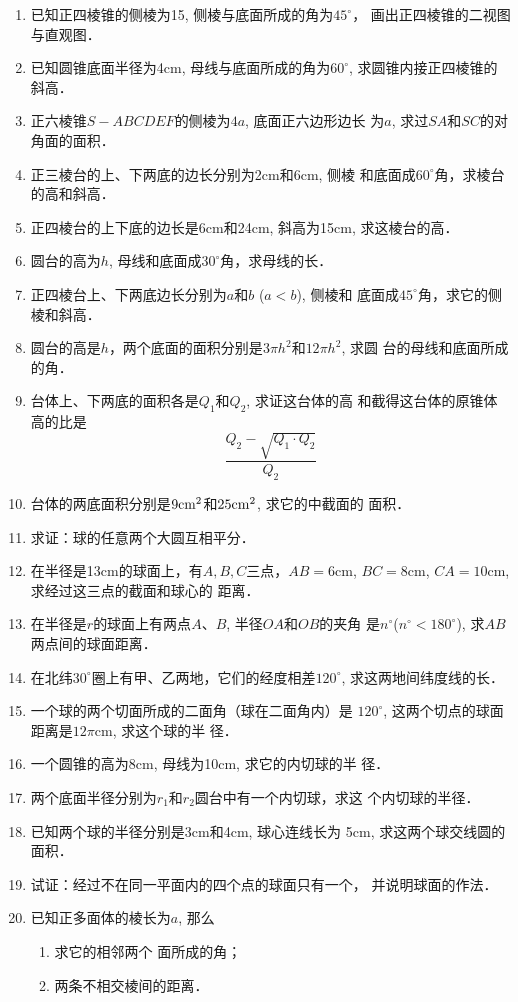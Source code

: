 \begin{enumerate}
\item 已知正四棱锥的侧棱为15, 侧棱与底面所成的角为$45^{\circ}$，
画出正四棱锥的二视图与直观图．
\item 已知圆锥底面半径为4cm, 母线与底面所成的角为$60^{\circ}$,
求圆锥内接正四棱锥的斜高．
\item 正六棱锥$S-ABCDEF$的侧棱为$4a$, 底面正六边形边长
为$a$, 求过$SA$和$SC$的对角面的面积．
\item 正三棱台的上、下两底的边长分别为2cm和6cm, 侧棱
和底面成$60^{\circ}$角，求棱台的高和斜高．
\item 正四棱台的上下底的边长是6cm和24cm, 斜高为15cm, 
求这棱台的高．
\item 圆台的高为$h$, 母线和底面成$30^{\circ}$角，求母线的长．
\item 正四棱台上、下两底边长分别为$a$和$b$ ($a<b$), 侧棱和
底面成$45^{\circ}$角，求它的侧棱和斜高．
\item 圆台的高是$h$，两个底面的面积分别是$3\pi h^2$和$12\pi h^2$, 求圆
台的母线和底面所成的角．
\item 台体上、下两底的面积各是$Q_1$和$Q_2$, 求证这台体的高
和截得这台体的原锥体高的比是
\[\frac{Q_2-\sqrt{Q_1\cdot Q_2}}{Q_2}\]
\item 台体的两底面积分别是$9{\rm cm^2}$和$25{\rm cm^2}$, 求它的中截面的
面积．
\item 求证：球的任意两个大圆互相平分．
\item 在半径是13cm的球面上，有$A,B,C$三点，$AB=6$cm, 
$BC=8$cm, $CA=10$cm, 求经过这三点的截面和球心的
距离．
\item 在半径是$r$的球面上有两点$A$、$B$, 半径$OA$和$OB$的夹角
是$n^{\circ}$($n^{\circ}<180^{\circ}$), 求$AB$两点间的球面距离．
\item 在北纬$30^{\circ}$圈上有甲、乙两地，它们的经度相差$120^{\circ}$,
求这两地间纬度线的长．
\item 一个球的两个切面所成的二面角（球在二面角内）是
$120^{\circ}$, 这两个切点的球面距离是$12\pi$cm, 求这个球的半
径．
\item 一个圆锥的高为8cm, 母线为10cm, 求它的内切球的半
径．
\item 两个底面半径分别为$r_1$和$r_2$圆台中有一个内切球，求这
个内切球的半径．
\item 已知两个球的半径分别是3cm和4cm, 球心连线长为
5cm, 求这两个球交线圆的面积．
\item 试证：经过不在同一平面内的四个点的球面只有一个，
并说明球面的作法．
\item 已知正多面体的棱长为$a$, 那么
\begin{enumerate}
\item 求它的相邻两个
面所成的角；
\item 两条不相交棱间的距离．
\end{enumerate}


\end{enumerate}
